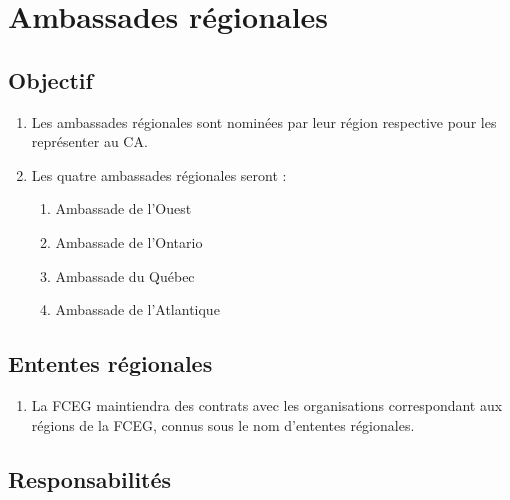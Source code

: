 \section{Ambassades régionales}
\label{ambassades-regionales}

\subsection{Objectif}
\label{ambassades-regionales-objectif}

\begin{enumerate}
 \item Les ambassades régionales sont nominées par leur région respective pour les représenter au CA.
 \item Les quatre ambassades régionales seront :
  \begin{enumerate}
   \item Ambassade de l'Ouest
   \item Ambassade de l'Ontario
   \item Ambassade du Québec
   \item Ambassade de l'Atlantique
  \end{enumerate}
\end{enumerate}

\subsection{Ententes régionales}
\label{ambassades-regionales-ententes-regionales}

\begin{enumerate}
 \item La FCEG maintiendra des contrats avec les organisations correspondant aux régions de la FCEG, connus sous le nom d'ententes régionales.
\end{enumerate}

\subsection{Responsabilités}
\label{ambassades-regionales-responsabilites}

